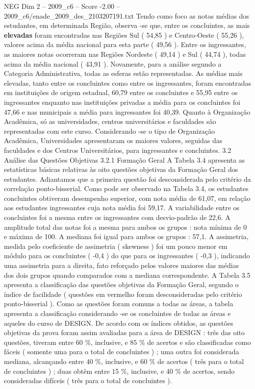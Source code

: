 \begin{textsample}{NEG Dim 2 – 2009\_c6 – Score -2.00 – 2009\_c6/enade\_2009\_des\_2103207191.txt}
Tendo como foco as notas médias dos estudantes, em determinada Região, observa -se que, entre os concluintes, as mais \textbf{elevadas} foram encontradas nas Regiões Sul ( 54,85 ) e Centro-Oeste ( 55,26 ), valores acima da média nacional para esta parte ( 49,56 ).
Entre os ingressantes, as maiores notas ocorreram nas Regiões Nordeste ( 49,14 ) e Sul ( 44,74 ), todas acima da média nacional ( 43,91 ).
Novamente, para a análise segundo a Categoria Administrativa, todas as esferas estão representadas.
As médias mais elevadas, tanto entre os concluintes como entre os ingressantes, foram encontradas em instituições de origem estadual, 60,79 entre os concluintes e 55,95 entre os ingressantes enquanto nas instituições privadas a média para os concluintes foi 47,66 e nas municipais a média para ingressantes foi 40,39.
Quanto à Organização Acadêmica, só as universidades, centros universitários e faculdades são representadas com este curso.
Considerando -se o tipo de Organização Acadêmica, Universidades apresentaram os maiores valores, seguidas das faculdades e dos Centros Universitários, para ingressantes e concluintes. 3.2 Análise das Questões Objetivas 3.2.1 Formação Geral A Tabela 3.4 apresenta as estatísticas básicas relativas às oito questões objetivas da Formação Geral dos estudantes.
Adiantamos que a primeira questão foi desconsiderada pelo critério da correlação ponto-bisserial.
Como pode ser observado na Tabela 3.4, os estudantes concluintes obtiveram desempenho superior, com nota média de 61,07, em relação aos estudantes ingressantes cuja nota média foi 59,17.
A variabilidade entre os concluintes foi a mesma entre os ingressantes com desvio-padrão de 22,6.
A amplitude total das notas foi a mesma para ambos os grupos : nota mínima de 0 e máxima de 100.
A mediana foi igual para ambos os grupos : 57,1.
A assimetria, medida pelo coeficiente de assimetria ( skewness ) foi um pouco menor em módulo para os concluintes ( -0,4 ) do que para os ingressantes ( -0,3 ), indicando uma assimetria para a direita, fato reforçado pelos valores maiores das médias dos dois grupos quando comparados com a mediana correspondente.
A Tabela 3.5 apresenta a classificação das questões objetivas da Formação Geral, segundo o índice de facilidade ( questões em vermelho foram desconsideradas pelo critério ponto-bisserial ).
Como as questões foram comuns a todas as áreas, a tabela apresenta a classificação considerando -se os concluintes de todas as áreas e aqueles do curso de DESIGN.
De acordo com os índices obtidos, as questões objetivas da prova foram assim avaliadas para a área de DESIGN : três das oito questões, tiveram entre 60 \%, inclusive, e 85 \% de acertos e são classificadas como fáceis ( somente uma para o total de concluintes ) ; uma outra foi considerada mediana, alcançando entre 40 \%, inclusive, e 60 \% de acertos ( três para o total de concluintes ) ; duas obtêm entre 15 \%, inclusive, e 40 \% de acertos, sendo consideradas difíceis ( três para o total de concluintes ).

\end{textsample}
